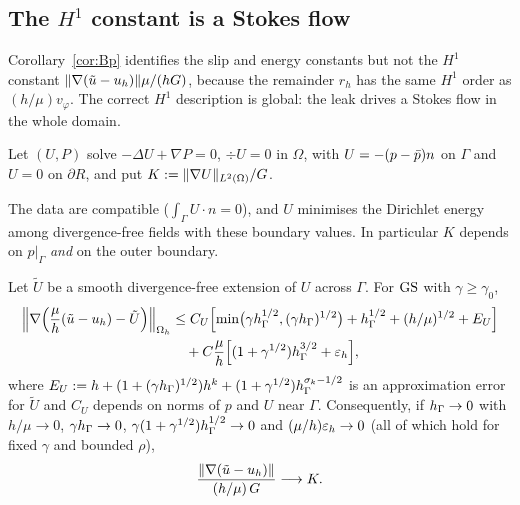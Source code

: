 \subsection{The \texorpdfstring{$H^1$}{H1} constant is a Stokes flow}\label{sec:leakflow}
Corollary~\ref{cor:Bp} identifies the slip and energy constants but not the $H^1$ constant $\lVert \nabla(\tilde u-u_h)\rVert\mu/(hG)$, because the remainder $r_h$ has the same $H^1$ order as $(h/\mu)v_\varphi$. The correct $H^1$ description is global: the leak drives a Stokes flow in the whole domain.

\begin{definition}\label{def:leak}
Let $(U,P)$ solve $-\Delta U+\nabla P=0$, $\div U=0$ in $\Omega$, with $U=-(p-\bar p)n$ on $\Gamma$ and $U=0$ on $\partial R$, and put $K:=\lVert \nabla U\rVert_{L^2(\Omega)}/G$.
\end{definition}

The data are compatible ($\int_\Gamma U\cdot n=0$), and $U$ minimises the Dirichlet energy among divergence-free fields with these boundary values. In particular $K$ depends on $p|_\Gamma$ \emph{and} on the outer boundary.

\begin{theorem}\label{thm:hc}
Let $\tilde U$ be a smooth divergence-free extension of $U$ across $\Gamma$. For $\mathrm{GS}$ with $\gamma\ge\gamma_0$,
\[
\begin{aligned}
\Bigl\|\nabla\Bigl(\frac\mu h(\tilde u-u_h)-\tilde U\Bigr)\Bigr\|_{\Omega_h}&\le C_U\Bigl[\min\bigl(\gamma h_\Gamma^{1/2},(\gamma h_\Gamma)^{1/2}\bigr)+h_\Gamma^{1/2}+(h/\mu)^{1/2}+E_U\Bigr]\\
&\quad+C\frac\mu h\Bigl[(1+\gamma^{1/2})h_\Gamma^{3/2}+\varepsilon_h\Bigr],
\end{aligned}
\]
where $E_U:=h+(1+(\gamma h_\Gamma)^{1/2})h^k+(1+\gamma^{1/2})h_\Gamma^{\sigma_k-1/2}$ is an approximation error for $\tilde U$ and $C_U$ depends on norms of $p$ and $U$ near $\Gamma$.
Consequently, if $h_\Gamma\to0$ with $h/\mu\to0$, $\gamma h_\Gamma\to0$, $\gamma(1+\gamma^{1/2})h_\Gamma^{1/2}\to0$ and $(\mu/h)\varepsilon_h\to0$ (all of which hold for fixed $\gamma$ and bounded $\rho$),
\[
\frac{\lVert \nabla(\tilde u-u_h)\rVert}{(h/\mu)\,G}\longrightarrow K .
\]
\end{theorem}

